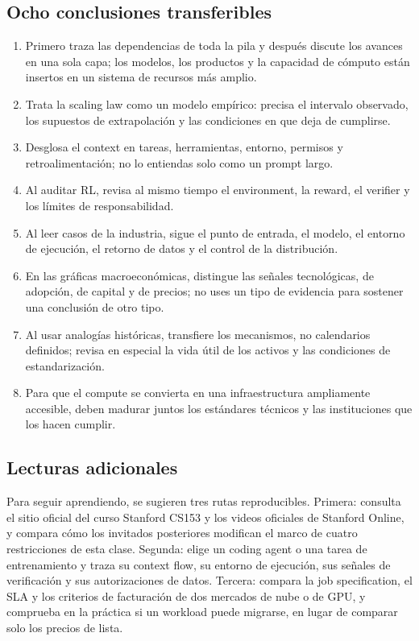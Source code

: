 \subsection{Ocho conclusiones transferibles}

\begin{enumerate}
  \item Primero traza las dependencias de toda la pila y después discute los avances en una sola capa; los modelos, los productos y la capacidad de cómputo están insertos en un sistema de recursos más amplio.
  \item Trata la scaling law como un modelo empírico: precisa el intervalo observado, los supuestos de extrapolación y las condiciones en que deja de cumplirse.
  \item Desglosa el context en tareas, herramientas, entorno, permisos y retroalimentación; no lo entiendas solo como un prompt largo.
  \item Al auditar RL, revisa al mismo tiempo el environment, la reward, el verifier y los límites de responsabilidad.
  \item Al leer casos de la industria, sigue el punto de entrada, el modelo, el entorno de ejecución, el retorno de datos y el control de la distribución.
  \item En las gráficas macroeconómicas, distingue las señales tecnológicas, de adopción, de capital y de precios; no uses un tipo de evidencia para sostener una conclusión de otro tipo.
  \item Al usar analogías históricas, transfiere los mecanismos, no calendarios definidos; revisa en especial la vida útil de los activos y las condiciones de estandarización.
  \item Para que el compute se convierta en una infraestructura ampliamente accesible, deben madurar juntos los estándares técnicos y las instituciones que los hacen cumplir.
\end{enumerate}

\subsection{Lecturas adicionales}

Para seguir aprendiendo, se sugieren tres rutas reproducibles. Primera: consulta el sitio oficial del curso Stanford CS153 y los videos oficiales de Stanford Online, y compara cómo los invitados posteriores modifican el marco de cuatro restricciones de esta clase. Segunda: elige un coding agent o una tarea de entrenamiento y traza su context flow, su entorno de ejecución, sus señales de verificación y sus autorizaciones de datos. Tercera: compara la job specification, el SLA y los criterios de facturación de dos mercados de nube o de GPU, y comprueba en la práctica si un workload puede migrarse, en lugar de comparar solo los precios de lista.

